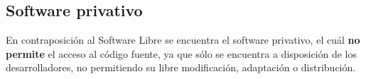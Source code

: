 \let\foo\section %
\let\section\subsection
\let\subsection\subsubsection
\graphicspath{{../../../temas_comunes/gnu_linux/img}}


\let\subsubsection\subsection
\let\subsection\section
\let\section\foo



\graphicspath{{img/si}}


\subsection{Software privativo}
En contraposición al Software Libre se encuentra el software privativo, el cuál \textbf{no permite} el acceso al código fuente, ya que sólo se encuentra a disposición de los desarrolladores, no permitiendo su libre modificación, adaptación o distribución.

